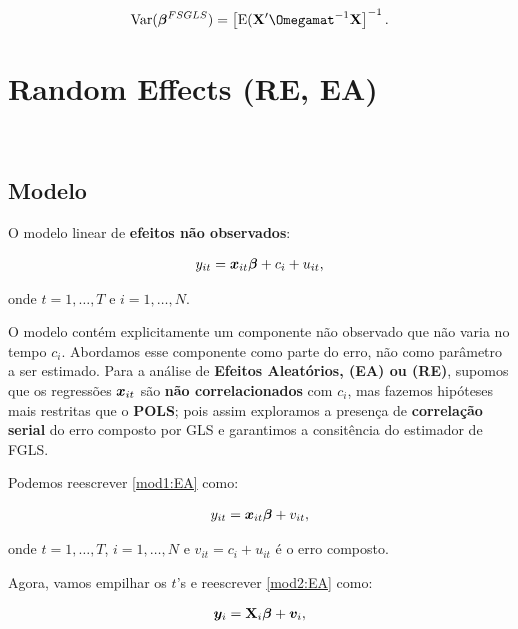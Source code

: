 \documentclass[11pt, oneside, a4paper, article]{article}
\numberwithin{equation}{section}
\begin{document}
\begin{description}
\vspace{-1.5 em}
\begin{align*}
\Var(\betavec^{FSGLS}) = \left[ \E(\Xmat' \Omegamat^{-1} \Xmat \right]^{-1}.
\end{align*}

\clearpage
\section{Random Effects (RE, EA)}
\noindent
\citet[Sec.10.4 -- Random Effects Methods, p.257]{wool-2010} \\

\subsection{Modelo}

O modelo linear de \textbf{efeitos não observados}:

\vspace{-1 em}
\begin{align} \label{mod1:EA}
y_{it} = \boldsymbol{x}_{it} \boldsymbol{\beta} + c_{i} + u_{it},
\end{align}

\noindent
onde
$t = 1, \dots, T$ e $i = 1, \dots, N$.

O modelo contém explicitamente um componente não observado que não varia no tempo $c_{i}$.
Abordamos esse componente como parte do erro, não como parâmetro a ser estimado.
Para a análise de \textbf{Efeitos Aleatórios, (EA) ou (RE)}, supomos que os regressões $\boldsymbol{x}_{it}$ são \textbf{não correlacionados} com $c_{i}$, mas fazemos hipóteses mais restritas que o \textbf{POLS}; pois assim exploramos a presença de \textbf{correlação serial} do erro composto por GLS e garantimos a consitência do estimador de FGLS.

Podemos reescrever \eqref{mod1:EA} como:

\vspace{-1 em}
\begin{align} \label{mod2:EA}
y_{it} = \boldsymbol{x}_{it} \boldsymbol{\beta} + v_{it},
\end{align}

\noindent
onde
$t = 1, \dots, T$, $i = 1, \dots, N$ e $\boxed{v_{it} = c_{i} + u_{it}}$ é o erro composto.

Agora, vamos empilhar os $t$'s e reescrever \eqref{mod2:EA} como:

\vspace{-1 em}
\begin{align} \label{mod3:EA}
\boldsymbol{y}_{i} = \mathbf{X}_{i} \boldsymbol{\beta} + \boldsymbol{v}_{i},
\end{align}


\end{description}
\end{document}
